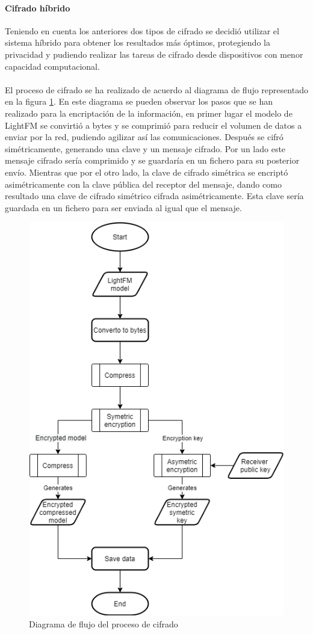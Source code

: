 \paragraph{Cifrado híbrido}
Teniendo en cuenta los anteriores dos tipos de cifrado se decidió utilizar el sistema híbrido para obtener los resultados más óptimos, protegiendo la privacidad y pudiendo realizar las tareas de cifrado desde dispositivos con menor capacidad computacional.
\\ \\ 
El proceso de cifrado se ha realizado de acuerdo al diagrama de flujo representado en la figura \ref{fig:Flow_Encryption}. En este diagrama se pueden observar los pasos que se han realizado para la encriptación de la información, en primer lugar el modelo de LightFM se convirtió a bytes y se comprimió para reducir el volumen de datos a enviar por la red, pudiendo agilizar así las comunicaciones. Después se cifró simétricamente, generando una clave y un mensaje cifrado. Por un lado este mensaje cifrado sería comprimido y se guardaría en un fichero para su posterior envío. Mientras que por el otro lado, la clave de cifrado simétrica se encriptó asimétricamente con la clave pública del receptor del mensaje, dando como resultado una clave de cifrado simétrico cifrada asimétricamente. Esta clave sería guardada en un fichero para ser enviada al igual que el mensaje.
\begin{figure}[H]
    \centering
    \includegraphics[height=0.6\textheight]{Figuras/flowchart_encryption.png}    
    \caption{Diagrama de flujo del proceso de cifrado} 
    \label{fig:Flow_Encryption}
\end{figure}


